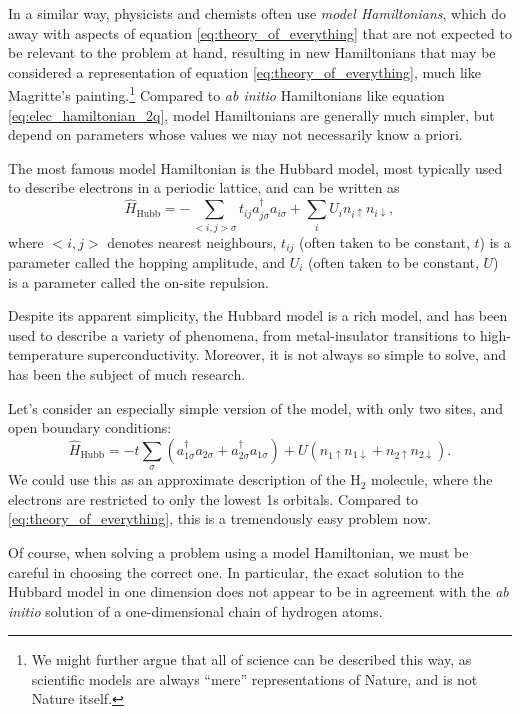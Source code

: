 In a similar way, physicists and chemists often use \emph{model Hamiltonians}, which do away with aspects of equation \eqref{eq:theory_of_everything} that are not expected to be relevant to the problem at hand, resulting in new Hamiltonians that may be considered a representation of equation \eqref{eq:theory_of_everything}, much like Magritte's painting.\footnote{We might further argue that all of science can be described this way, as scientific models are always ``mere'' representations of Nature, and is not Nature itself.} Compared to \emph{ab initio} Hamiltonians like equation \eqref{eq:elec_hamiltonian_2q}, model Hamiltonians are generally much simpler, but depend on parameters whose values we may not necessarily know a priori.

The most famous model Hamiltonian is the Hubbard model, most typically used to describe electrons in a periodic lattice, and can be written as
\begin{equation}
\label{eq:hubbard}
\hat H_\mathrm{Hubb} = - \sum_{<i,j>\sigma} t_{ij} a_{j\sigma}^\dag a_{i\sigma} + \sum_i U_in_{i\uparrow}n_{i\downarrow},
\end{equation}
where $<i,j>$ denotes nearest neighbours, $t_{ij}$ (often taken to be constant, $t$) is a parameter called the hopping amplitude, and $U_i$ (often taken to be constant, $U$) is a parameter called the on-site repulsion.

Despite its apparent simplicity, the Hubbard model is a rich model, and has been used to describe a variety of phenomena, from metal-insulator transitions to high-temperature superconductivity. Moreover, it is not always so simple to solve, and has been the subject of much research.

Let's consider an especially simple version of the model, with only two sites, and open boundary conditions:
\begin{equation}
\label{eq:hubbard_h2}
\hat H_\mathrm{Hubb} = - t\sum_{\sigma}(a_{1\sigma}^\dag a_{2\sigma} + a_{2\sigma}^\dag a_{1\sigma}) + U(n_{1\uparrow}n_{1\downarrow}+n_{2\uparrow}n_{2\downarrow}).
\end{equation}
We could use this as an approximate description of the H$_2$ molecule, where the electrons are restricted to only the lowest 1s orbitals. Compared to \eqref{eq:theory_of_everything}, this is a tremendously easy problem now.

Of course, when solving a problem using a model Hamiltonian, we must be careful in choosing the correct one. In particular, the exact solution to the Hubbard model in one dimension does not appear to be in agreement with the \emph{ab initio} solution of a one-dimensional chain of hydrogen atoms.

